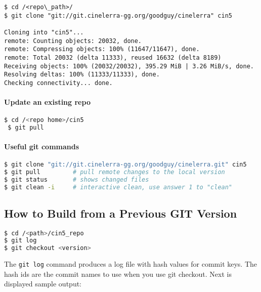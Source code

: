 \begin{lstlisting}[numbers=none]
$ cd /<repo\_path>/
$ git clone "git://git.cinelerra-gg.org/goodguy/cinelerra" cin5

Cloning into "cin5"...
remote: Counting objects: 20032, done.
remote: Compressing objects: 100% (11647/11647), done.
remote: Total 20032 (delta 11333), reused 16632 (delta 8189)
Receiving objects: 100% (20032/20032), 395.29 MiB | 3.26 MiB/s, done.
Resolving deltas: 100% (11333/11333), done.
Checking connectivity... done.
\end{lstlisting}

\paragraph{Update an existing repo}%
\label{par:update_an_existing_repo}

\begin{lstlisting}[language=bash,numbers=none]
 $ cd /<repo home>/cin5
 $ git pull
\end{lstlisting}

\paragraph{Useful git commands}%
\label{par:useful_git_commands}


\begin{lstlisting}[language=bash,numbers=none]
$ git clone "git://git.cinelerra-gg.org/goodguy/cinelerra.git" cin5
$ git pull         # pull remote changes to the local version
$ git status       # shows changed files
$ git clean -i     # interactive clean, use answer 1 to "clean"
\end{lstlisting}



\subsection{How to Build from a Previous GIT Version}%
\label{sub:how_to_build_from_a_previous_git_version}


\begin{lstlisting}[language=bash,numbers=none]
$ cd /<path>/cin5_repo
$ git log
$ git checkout <version>
\end{lstlisting}


The \texttt{git log} command produces a log file with hash values for commit keys.  The hash ids are the commit names to use when you use git checkout.  
Next is displayed sample output:


